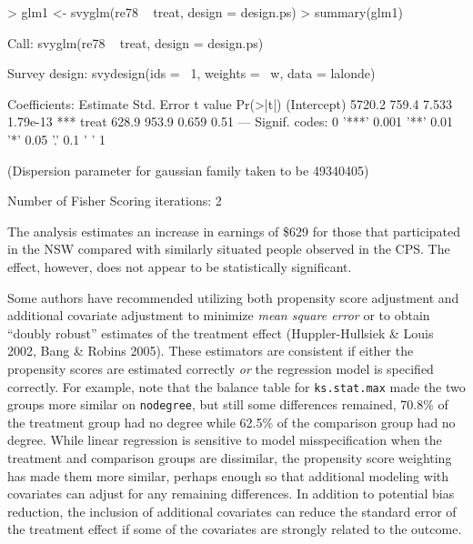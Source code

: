 \documentclass{article}
\begin{document}
\begin{Schunk}
\begin{Sinput}
> glm1 <- svyglm(re78 ~ treat, design = design.ps)
> summary(glm1)
\end{Sinput}
\begin{Soutput}
Call:
svyglm(re78 ~ treat, design = design.ps)

Survey design:
svydesign(ids = ~1, weights = ~w, data = lalonde)

Coefficients:
            Estimate Std. Error t value Pr(>|t|)    
(Intercept)   5720.2      759.4   7.533 1.79e-13 ***
treat          628.9      953.9   0.659     0.51    
---
Signif. codes:  0 '***' 0.001 '**' 0.01 '*' 0.05 '.' 0.1 ' ' 1 

(Dispersion parameter for gaussian family taken to be 49340405)

Number of Fisher Scoring iterations: 2
\end{Soutput}
\end{Schunk}

The analysis estimates an increase in earnings of
\$629 for those that participated in the NSW compared
with similarly situated people observed in the CPS. The effect, however, does
not appear to be statistically significant.

Some authors have recommended utilizing both propensity score adjustment and
additional covariate adjustment to minimize \textit{mean square error} or to obtain ``doubly robust'' estimates of the
treatment effect (Huppler-Hullsiek \& Louis 2002, Bang \& Robins 2005). These estimators are consistent if
either the propensity scores are estimated correctly \textit{or} the regression
model is specified correctly. For example, note that the balance table for
\texttt{ks.stat.max} made the two groups more similar on \texttt{nodegree}, but
still some differences remained, 70.8\%
of the treatment group had no degree while
62.5\% of the comparison group had no
degree. While linear regression is sensitive to model misspecification when the
treatment and comparison groups are dissimilar, the propensity score weighting
has made them more similar, perhaps enough so that additional modeling with
covariates can adjust for any remaining differences. In addition to potential
bias reduction, the inclusion of additional covariates can reduce the standard
error of the treatment effect if some of the covariates are strongly related to
the outcome.
\end{document}
